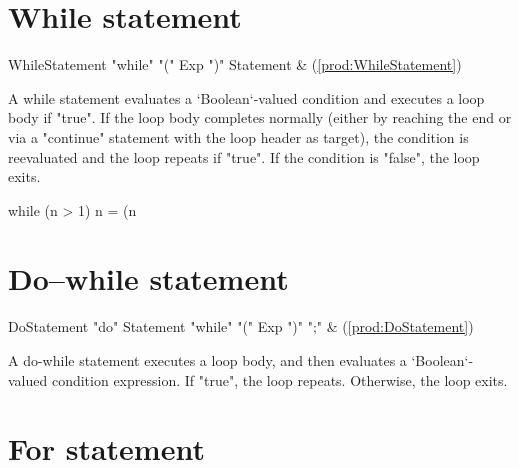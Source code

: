 \section{While statement}

\begin{bbgrammar}
 WhileStatement    \: \xcd"while" \xcd"(" Exp \xcd")" Statement & (\ref{prod:WhileStatement})\\%
\end{bbgrammar}


A while statement evaluates a \xcd`Boolean`-valued condition and executes a
loop body if \xcd"true". If the loop body completes normally (either by
reaching the end or via a \xcd"continue" statement with the loop header as
target), the condition is reevaluated and the loop repeats if \xcd"true". If
the condition is \xcd"false", the loop exits.

\begin{xten}
  while (n > 1) {
     n = (n %
  }
\end{xten}

\section{Do--while statement}

\begin{bbgrammar}
 DoStatement    \: \xcd"do" Statement \xcd"while" \xcd"(" Exp \xcd")" \xcd";" & (\ref{prod:DoStatement})\\%
\end{bbgrammar}



A do-while statement executes a loop body, and then evaluates a
\xcd`Boolean`-valued condition expression. If \xcd"true", the loop repeats.
Otherwise, the loop exits.



\section{For statement}

